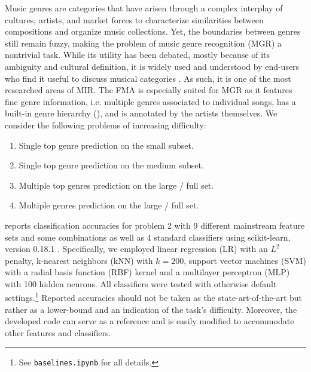 \documentclass{article}
\begin{document}
Music genres are categories that have arisen through a complex interplay of cultures, artists, and market forces to characterize similarities between compositions and organize music collections. Yet, the boundaries between genres still remain fuzzy, making the problem of music genre recognition (MGR) a nontrivial task.
While its utility has been debated, mostly because of its ambiguity and cultural definition, it is widely used and understood by end-users who find it useful to discuss musical categories \cite{mgr_why}.
As such, it is one of the most researched areas of MIR.
The FMA is especially suited for MGR as it features fine genre information, i.e. multiple genres associated to individual songs, has a built-in genre hierarchy (), and is annotated by the artists themselves.
We consider the following problems of increasing difficulty:
\begin{enumerate}
	\item Single top genre prediction on the small subset.
	\item Single top genre prediction on the medium subset.
	\item Multiple top genres prediction on the large / full set.
	\item Multiple genres prediction on the large / full set.
\end{enumerate}


 reports classification accuracies for problem 2 with 9 different mainstream feature sets and some combinations as well as 4 standard classifiers using scikit-learn, version 0.18.1 \cite{scikit-learn}. Specifically, we employed linear regression (LR) with an $L^2$ penalty, k-nearest neighbors (kNN) with $k=200$, support vector machines (SVM) with a radial basis function (RBF) kernel and a multilayer perceptron (MLP) with 100 hidden neurons. All classifiers were tested with otherwise default settings.\footnote{See \texttt{baselines.ipynb} for all details.} Reported accuracies should not be taken as the state-art-of-the-art but rather as a lower-bound and an indication of the task's difficulty. Moreover, the developed code can serve as a reference and is easily modified to accommodate other features and classifiers.
\end{document}
